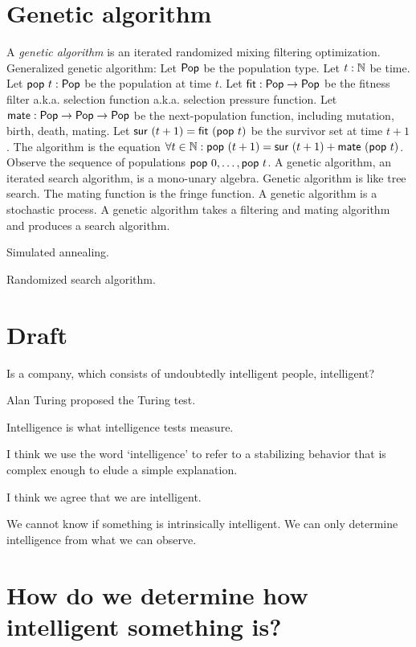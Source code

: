\section{Genetic algorithm}

\newcommand\fit{\fun{fit}}
\newcommand\mate{\fun{mate}}
\newcommand\pop{\fun{pop}}
\newcommand\sur{\fun{sur}}
\newcommand\Pop{\fun{Pop}}

A \emph{genetic algorithm} is an iterated randomized mixing filtering optimization.
Generalized genetic algorithm:
Let \(\Pop\) be the population type.
Let \(t : \mathbb{N}\) be time.
Let \(\pop~t : \Pop\) be the population at time \(t\).
Let \(\fit : \Pop \to \Pop\) be the fitness filter a.k.a. selection function a.k.a. selection pressure function.
Let \(\mate : \Pop \to \Pop \to \Pop\) be the next-population function,
including mutation, birth, death, mating.
Let \(\sur~(t+1) = \fit~(\pop~t)\) be the survivor set at time \(t+1\).
The algorithm is the equation \(\forall t \in \Nat : \pop~(t+1) = \sur~(t+1) + \mate~(\pop~t)\).
Observe the sequence of populations \(\pop~0, \ldots, \pop~t\).
A genetic algorithm, an iterated search algorithm, is a mono-unary algebra.
Genetic algorithm is like tree search.
The mating function is the fringe function.
A genetic algorithm is a stochastic process.
A genetic algorithm takes a filtering and mating algorithm and produces a search algorithm.

Simulated annealing.

Randomized search algorithm.

\section{Draft}

Is a company, which consists of undoubtedly intelligent people, intelligent?

Alan Turing proposed the Turing test.

Intelligence is what intelligence tests measure.

I think we use the word `intelligence' to refer to a stabilizing behavior
that is complex enough to elude a simple explanation.

I think we agree that we are intelligent.

We cannot know if something is intrinsically intelligent.
We can only determine intelligence from what we can observe.

\section{How do we determine how intelligent something is?}

